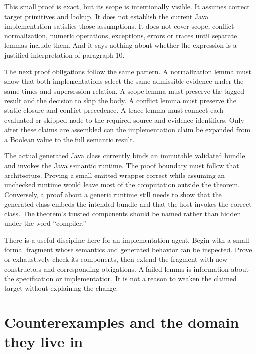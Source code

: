 
This small proof is exact, but its scope is intentionally visible. It assumes
correct target primitives and lookup. It does not establish the current Java
implementation satisfies those assumptions. It does not cover scope, conflict
normalization, numeric operations, exceptions, errors or traces until separate
lemmas include them. And it says nothing about whether the expression is a
justified interpretation of paragraph 10.

The next proof obligations follow the same pattern. A normalization lemma must
show that both implementations select the same admissible evidence under the
same times and supersession relation. A scope lemma must preserve the tagged
result and the decision to skip the body. A conflict lemma must preserve the
static closure and conflict precedence. A trace lemma must connect each
evaluated or skipped node to the required source and evidence identifiers.
Only after these claims are assembled can the implementation claim be expanded
from a Boolean value to the full semantic result.

The actual generated Java class currently binds an immutable validated bundle
and invokes the Java semantic runtime. The proof boundary must follow that
architecture. Proving a small emitted wrapper correct while assuming an
unchecked runtime would leave most of the computation outside the theorem.
Conversely, a proof about a generic runtime still needs to show that the
generated class embeds the intended bundle and that the host invokes the
correct class. The theorem's trusted components should be named rather than
hidden under the word ``compiler.''

There is a useful discipline here for an implementation agent. Begin with a
small formal fragment whose semantics and generated behavior can be inspected.
Prove or exhaustively check its components, then extend the fragment with new
constructors and corresponding obligations. A failed lemma is information
about the specification or implementation. It is not a reason to weaken the
claimed target without explaining the change.

\section{Counterexamples and the domain they live in}
\label{merge:M03:09}

